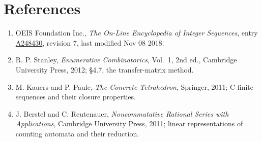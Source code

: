 \documentclass[11pt]{article}
\theoremstyle{definition}
\begin{document}
\section{References}

\begin{enumerate}

\item OEIS Foundation Inc., \emph{The On-Line Encyclopedia of Integer Sequences}, entry \href{https://oeis.org/A248430}{A248430}, revision 7, last modified Nov 08 2018.

\item R. P. Stanley, \emph{Enumerative Combinatorics}, Vol.~1, 2nd ed., Cambridge University Press, 2012; \S4.7, the transfer-matrix method.

\item M. Kauers and P. Paule, \emph{The Concrete Tetrahedron}, Springer, 2011; C-finite sequences and their closure properties.

\item J. Berstel and C. Reutenauer, \emph{Noncommutative Rational Series with Applications}, Cambridge University Press, 2011; linear representations of counting automata and their reduction.

\end{enumerate}
\end{document}
